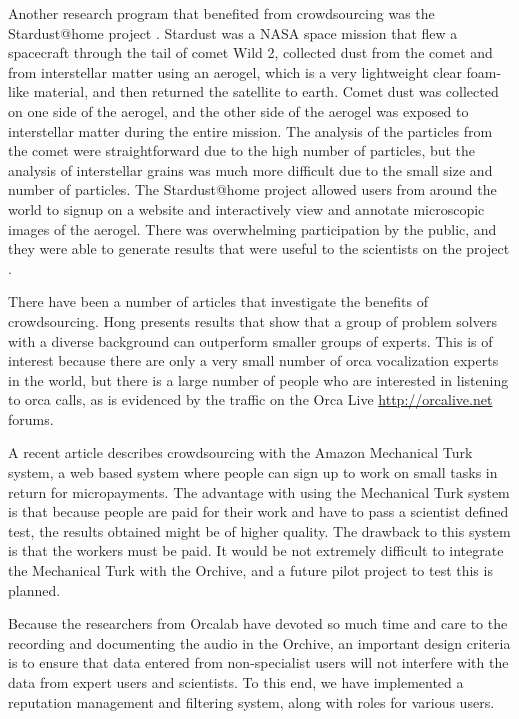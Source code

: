 Another research program that benefited from crowdsourcing was the
Stardust@home project \cite{mendez06_stardust}.  Stardust
\cite{atkins97_stardust} was a NASA space mission that flew a
spacecraft through the tail of comet Wild 2, collected dust from the
comet and from interstellar matter using an aerogel, which is a very
lightweight clear foam-like material, and then returned the satellite
to earth.  Comet dust was collected on one side of the aerogel, and
the other side of the aerogel was exposed to interstellar matter
during the entire mission.  The analysis of the particles from the
comet were straightforward due to the high number of particles, but
the analysis of interstellar grains was much more difficult due to the
small size and number of particles.  The Stardust@home project allowed
users from around the world to signup on a website and interactively
view and annotate microscopic images of the aerogel.  There was
overwhelming participation by the public, and they were able to
generate results that were useful to the scientists on the project
\cite{atkins97_stardust}.

There have been a number of articles that investigate the benefits of
crowdsourcing.  Hong \cite{hong04_crowdsourcing} presents results that
show that a group of problem solvers with a diverse background can
outperform smaller groups of experts.  This is of interest because
there are only a very small number of orca vocalization experts in the
world, but there is a large number of people who are interested in
listening to orca calls, as is evidenced by the traffic on the Orca
Live \url{http://orcalive.net} forums.  

A recent article \cite{kittur08_crowdsourcing} describes crowdsourcing
with the Amazon Mechanical Turk system, a web based system where
people can sign up to work on small tasks in return for micropayments.
The advantage with using the Mechanical Turk system is that because
people are paid for their work and have to pass a scientist defined
test, the results obtained might be of higher quality.  The drawback
to this system is that the workers must be paid.  It would be not
extremely difficult to integrate the Mechanical Turk with the Orchive,
and a future pilot project to test this is planned.

Because the researchers from Orcalab have devoted so much time and
care to the recording and documenting the audio in the Orchive, an
important design criteria is to ensure that data entered from
non-specialist users will not interfere with the data from expert
users and scientists.  To this end, we have implemented a reputation
management and filtering system, along with roles for various users.

